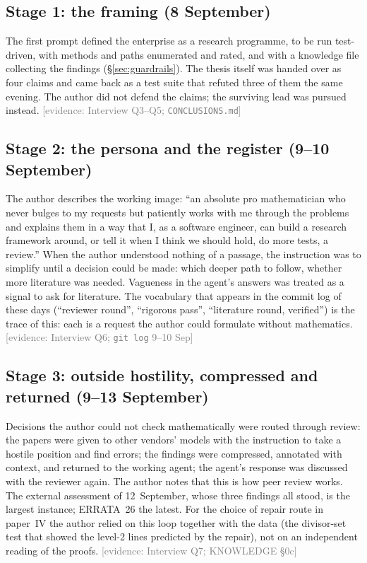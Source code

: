 \documentclass[11pt,a4paper]{article}
\newcommand{\evidence}[1]{{\footnotesize\textcolor{Gray}{[evidence: #1]}}}
\newcommand{\file}[1]{\texttt{#1}}
\begin{document}
\subsection{Stage 1: the framing (8 September)}
The first prompt defined the enterprise as a research programme, to be run test-driven, with methods and paths
enumerated and rated, and with a knowledge file collecting the findings (\S\ref{sec:guardrails}). The thesis itself
was handed over as four claims and came back as a test suite that refuted three of them the same evening. The
author did not defend the claims; the surviving lead was pursued instead. \evidence{Interview Q3--Q5; \file{CONCLUSIONS.md}}

\subsection{Stage 2: the persona and the register (9--10 September)}
The author describes the working image: ``an absolute pro mathematician who never bulges to my requests but
patiently works with me through the problems and explains them in a way that I, as a software engineer, can build
a research framework around, or tell it when I think we should hold, do more tests, a review.'' When the author
understood nothing of a passage, the instruction was to simplify until a decision could be made: which deeper path
to follow, whether more literature was needed. Vagueness in the agent's answers was treated as a signal to ask for
literature. The vocabulary that appears in the commit log of these days (``reviewer round'', ``rigorous pass'',
``literature round, verified'') is the trace of this: each is a request the author could formulate without
mathematics. \evidence{Interview Q6; \texttt{git log} 9--10 Sep}

\subsection{Stage 3: outside hostility, compressed and returned (9--13 September)}
Decisions the author could not check mathematically were routed through review: the papers were given to other
vendors' models with the instruction to take a hostile position and find errors; the findings were compressed,
annotated with context, and returned to the working agent; the agent's response was discussed with the reviewer
again. The author notes that this is how peer review works. The external assessment of 12~September, whose three
findings all stood, is the largest instance; ERRATA~26 the latest. For the choice of repair route in paper~IV the
author relied on this loop together with the data (the divisor-set test that showed the level-2 lines predicted by
the repair), not on an independent reading of the proofs. \evidence{Interview Q7; KNOWLEDGE \S0c}
\end{document}

